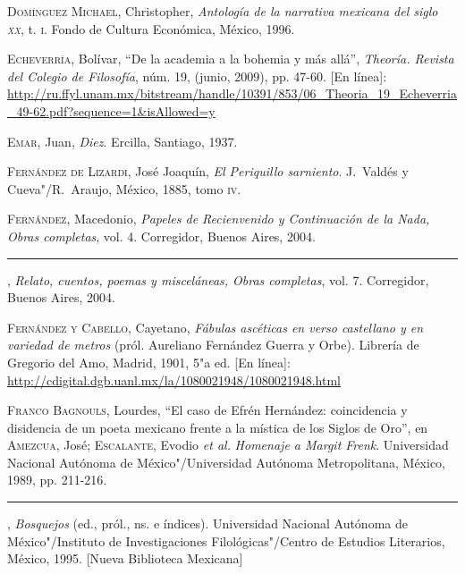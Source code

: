 \documentclass[14pt,twoside,final]{extbook} %
\begin{document}
\textsc{Domínguez Michael}, Christopher, \emph{Antología de la narrativa mexicana del siglo \textsc{xx}}, t. \textsc{i}. Fondo de Cultura Económica, México, 1996.\label{bib:dominguez1996}

\textsc{Echeverría}, Bolívar, ``De la academia a la bohemia y más allá'', \emph{Theoría. Revista del Colegio de Filosofía}, núm. 19, (junio, 2009), pp. 47-60. [En línea]: \url{http://ru.ffyl.unam.mx/bitstream/handle/10391/853/06_Theoria_19_Echeverria_49-62.pdf?sequence=1&isAllowed=y}\label{bib:echeverria2009}

\textsc{Emar}, Juan, \emph{Diez}. Ercilla, Santiago, 1937.\label{bib:emar1937}

\textsc{Fernández de Lizardi}, José Joaquín, \emph{El Periquillo sarniento}. J.~Valdés y Cueva"/R.~Araujo, México, 1885, tomo \textsc{iv}.\label{bib:fernandezlizardi1885}

\textsc{Fernández}, Macedonio, \emph{Papeles de Recienvenido y Continuación de la Nada, Obras completas}, vol. 4. Corregidor, Buenos Aires, 2004.\label{bib:fernandez2004a}

\rule{1cm}{0.4pt}, \emph{Relato, cuentos, poemas y misceláneas, Obras completas}, vol. 7. Corregidor, Buenos Aires, 2004.\label{bib:fernandez2004b}

\textsc{Fernández y Cabello}, Cayetano, \emph{Fábulas ascéticas en verso castellano y en variedad de metros} (pról. Aureliano Fernández Guerra y Orbe). Librería de Gregorio del Amo, Madrid, 1901, 5"a ed. [En línea]: \url{http://cdigital.dgb.uanl.mx/la/1080021948/1080021948.html}\label{bib:fcabello1901}

\textsc{Franco Bagnouls}, Lourdes, ``El caso de Efrén Hernández: coincidencia y disidencia de un poeta mexicano frente a la mística de los Siglos de Oro'', en \textsc{Amezcua}, José; \textsc{Escalante}, Evodio \emph{et al.} \emph{Homenaje a Margit Frenk}. Universidad Nacional Autónoma de México"/Universidad Autónoma Metropolitana, México, 1989, pp. 211-216.\label{bib:franco1989}

\rule{1cm}{0.4pt}, \emph{Bosquejos} (ed., pról., ns. e índices). Universidad Nacional Autónoma de México"/Instituto de Investigaciones Filológicas"/Centro de Estudios Literarios, México, 1995. [Nueva Biblioteca Mexicana]\label{bib:franco1995}
\end{document}
